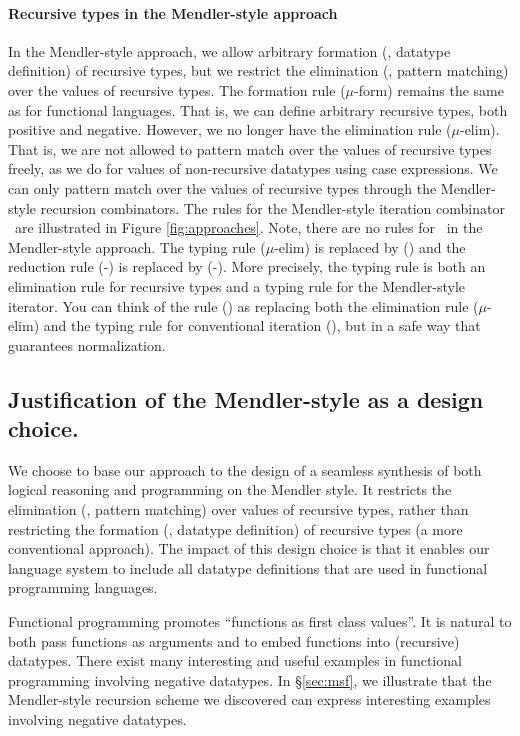 \paragraph{Recursive types in the Mendler-style approach}
In the Mendler-style approach, we allow arbitrary formation
(\ie, datatype definition) of recursive types, but we restrict
the elimination (\ie, pattern matching) over the values of recursive types. 
The formation rule {\small($\mu$-form)} remains the same as
for functional languages. That is, we can define arbitrary recursive types,
both positive and negative. However, we no longer have the elimination
rule {\small($\mu$-elim)}. That is, we are not allowed to pattern match over
the values of recursive types freely, as we do for values of non-recursive
datatypes using case expressions. We can only pattern match over
the values of recursive types through the Mendler-style recursion
combinators. The rules for the Mendler-style iteration combinator \MIt\
are illustrated in Figure \ref{fig:approaches}.
Note, there are no rules for \unIn\ in the Mendler-style approach.
The typing rule {\small($\mu$-elim)} is replaced by {\small(\MIt)} and
the reduction rule {\small(\unIn-\In)} is replaced by {\small(\MIt-\In)}.
More precisely, the typing rule {\small \MIt} is both an elimination rule
for recursive types and a typing rule for the Mendler-style iterator.
You can think of the rule {\small(\MIt)} as replacing both the elimination rule
{\small($\mu$-elim)} and the typing rule for conventional iteration
{\small(\It)}, but in a safe way that guarantees normalization.

\subsection{Justification of the Mendler-style as a design choice.}
\label{sec:intro:concepts:mendler}
We choose to base our approach to the design of a seamless synthesis of both
logical reasoning and programming on the Mendler style. It restricts
the elimination (\ie, pattern matching) over values of recursive types,
rather than restricting the formation (\ie, datatype definition) of recursive types
(a more conventional approach). The impact of this design choice is that
it enables our language system to include all datatype definitions that
are used in functional programming languages.

Functional programming promotes ``functions as first class values''. It is natural
to both pass functions as arguments and to embed functions into (recursive)
datatypes.  There exist many interesting and useful examples in functional
programming involving negative datatypes. In \S\ref{sec:msf}, we illustrate that
the Mendler-style recursion scheme we discovered can express interesting examples
involving negative datatypes.



